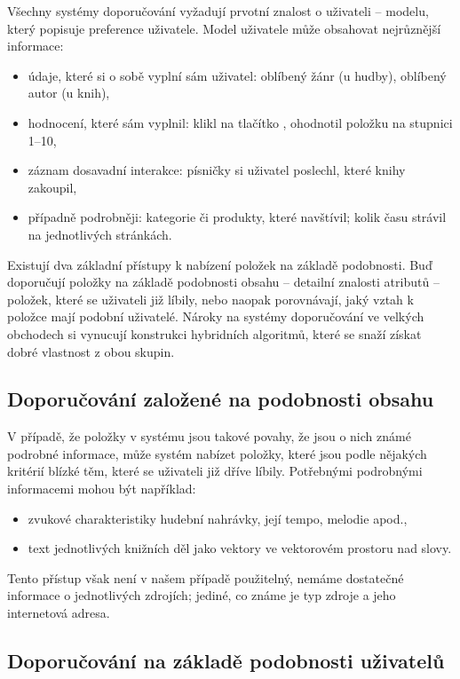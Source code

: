 Všechny systémy doporučování vyžadují prvotní znalost o uživateli -- modelu, který popisuje preference uživatele.
Model uživatele může obsahovat nejrůznější informace:
\begin{itemize}
    \item údaje, které si o sobě vyplní sám uživatel: oblíbený žánr (u hudby), oblíbený autor (u knih),
    \item hodnocení, které sám vyplnil: klikl na tlačítko , ohodnotil položku na stupnici 1--10,
    \item záznam dosavadní interakce: písničky si uživatel poslechl, které knihy zakoupil,
	\item případně podrobněji: kategorie či produkty, které navštívil; kolik času strávil na jednotlivých stránkách.
\end{itemize}

Existují dva základní přístupy k nabízení položek na základě podobnosti.
Buď doporučují položky na základě podobnosti obsahu -- detailní znalosti atributů -- položek, které se uživateli již líbily,
nebo naopak porovnávají, jaký vztah k položce mají podobní uživatelé.
Nároky na systémy doporučování ve velkých obchodech si vynucují konstrukci hybridních algoritmů, které se snaží získat dobré vlastnost z obou skupin.

\subsection{Doporučování založené na podobnosti obsahu}

V případě, že položky v systému jsou takové povahy, že jsou o nich známé podrobné informace, může systém nabízet položky, které jsou podle nějakých kritérií blízké těm, které se uživateli již dříve líbily.
Potřebnými podrobnými informacemi mohou být například:
\begin{itemize}
    \item zvukové charakteristiky hudební nahrávky, její tempo, melodie apod.,
    \item text jednotlivých knižních děl jako vektory ve vektorovém prostoru nad slovy.
\end{itemize}

Tento přístup však není v našem případě použitelný, nemáme dostatečné informace o jednotlivých zdrojích; jediné, co známe je typ zdroje a jeho internetová adresa.

\subsection{Doporučování na základě podobnosti uživatelů}

